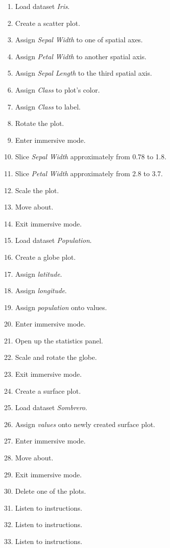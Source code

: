 \documentclass[thesis=M,english,hidelinks]{FITthesisXE}[2012/06/26]
\begin{document}
\begin{enumerate}
\item Load dataset \emph{Iris}.
\item Create a scatter plot.
\item Assign \emph{Sepal Width} to one of spatial axes.
\item Assign \emph{Petal Width} to another spatial axis.
\item Assign \emph{Sepal Length} to the third spatial axis.
\item Assign \emph{Class} to plot's color.
\item Assign \emph{Class} to label.
\item Rotate the plot.
\item Enter immersive mode.
\item Slice \emph{Sepal Width} approximately from 0.78 to 1.8.
\item Slice \emph{Petal Width} approximately from 2.8 to 3.7.
\item Scale the plot.
\item Move about.
\item Exit immersive mode.
\item Load dataset \emph{Population}.
\item Create a globe plot.
\item Assign \emph{latitude}.
\item Assign \emph{longitude}.
\item Assign \emph{population} onto values.
\item Enter immersive mode.
\item Open up the statistics panel.
\item Scale and rotate the globe.
\item Exit immersive mode.
\item Create a surface plot.
\item Load dataset \emph{Sombrero}.
\item Assign \emph{values} onto newly created surface plot.
\item Enter immersive mode.
\item Move about.
\item Exit immersive mode.
\item Delete one of the plots.
\item Listen to instructions.
\item Listen to instructions.
\item Listen to instructions.
\end{enumerate}
\end{document}
